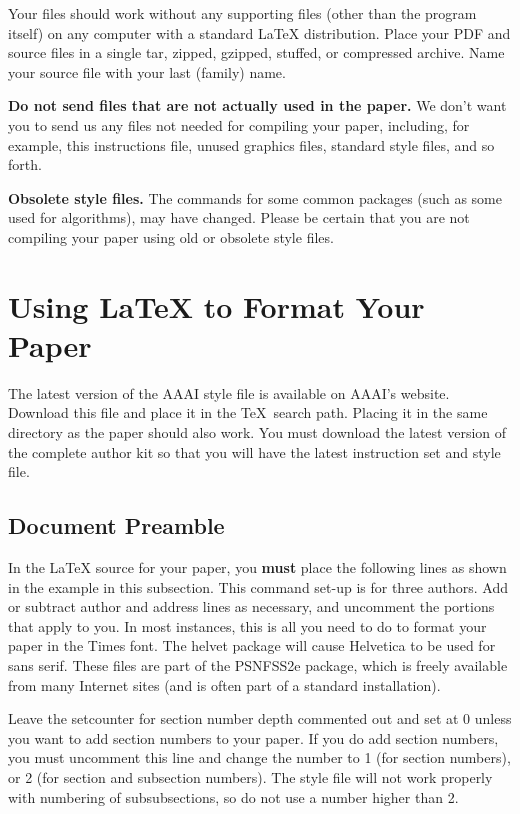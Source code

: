 \documentclass[letterpaper]{article} %
\begin{document}
Your files should work without any supporting files (other than the program itself) on any computer with a standard \LaTeX{} distribution. Place your PDF and source files in a single tar, zipped, gzipped, stuffed, or compressed archive. Name your source file with your last (family) name.

\textbf{Do not send files that are not actually used in the paper.} We don't want you to send us any files not needed for compiling your paper, including, for example, this instructions file, unused graphics files, standard style files, and so forth.

\textbf{Obsolete style files.}  The commands for some common packages (such as some used for algorithms), may have changed. Please be certain that you are not compiling your paper using old or obsolete style files.

\section{Using \LaTeX{} to Format Your Paper}

The latest version of the AAAI style file is available on AAAI's website. Download this file and place it in  the \TeX\ search path. Placing it in the same directory as the paper should also work. You must download the latest version of the complete author kit so that you will have the latest instruction set and style file.

\subsection{Document Preamble}

In the \LaTeX{} source for your paper, you \textbf{must} place the following lines as shown in the example in this subsection. This command set-up is for three authors. Add or subtract author and address lines as necessary, and uncomment the portions that apply to you. In most instances, this is all you need to do to format your paper in the Times font. The helvet package will cause Helvetica to be used for sans serif. These files are part of the PSNFSS2e package, which is freely available from many Internet sites (and is often part of a standard installation).

Leave the setcounter for section number depth commented out and set at 0 unless you want to add section numbers to your paper. If you do add section numbers, you must uncomment this line and change the number to 1 (for section numbers), or 2 (for section and subsection numbers). The style file will not work properly with numbering of subsubsections, so do not use a number higher than 2.
\end{document}
